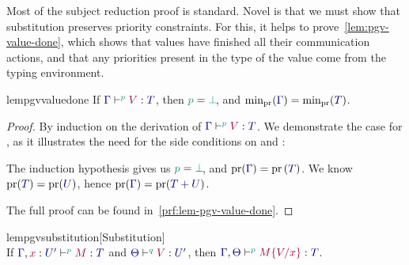 \documentclass[main.tex]{subfiles}
\begin{document}
Most of the subject reduction proof is standard. Novel is that we must show that substitution preserves priority constraints. For this, it helps to prove~\cref{lem:pgv-value-done}, which shows that values have finished all their communication actions, and that any priorities present in the type of the value come from the typing environment.
\begin{restatablelemma}{lempgvvaluedone}
  \label{lem:pgv-value-done}
  If $\tseq[\cs{p}]{\ty{\Gamma}}{V}{T}$, then $\cs{p}=\cs{\pbot}$, and $\minpr(\ty{\Gamma})=\minpr(\ty{T})$.
\end{restatablelemma}
\begin{proof}
  By induction on the derivation of $\tseq[\cs{p}]{\ty{\Gamma}}{V}{T}$. We demonstrate the case for , as it illustrates the need for the side conditions on  and :
  \begin{case*}
    The induction hypothesis gives us $\cs{p}=\cs{\pbot}$, and $\pr(\ty{\Gamma})=\pr{(\ty{T})}$. We know $\pr(\ty{T})=\pr({\ty{U}})$, hence $\pr(\ty{\Gamma})=\pr(\ty{\tysum{T}{U}})$.
    \begin{mathpar}
      \small
    \end{mathpar}
  \end{case*}
  The full proof can be found in~\cref{prf:lem-pgv-value-done}.
\end{proof}
\begin{restatablelemma}{lempgvsubstitution}[Substitution]
  \label{lem:pgv-substitution}
  \hfill\\%
  If $\tseq[\cs{p}]{\ty{\Gamma},\tmty{x}{U'}}{M}{T}$ and $\tseq[\cs{q}]{\ty{\Theta}}{V}{U'}$, then $\tseq[\cs{p}]{\ty{\Gamma},\ty{\Theta}}{\subst{M}{V}{x}}{T}$.
\end{restatablelemma}
\end{document}
